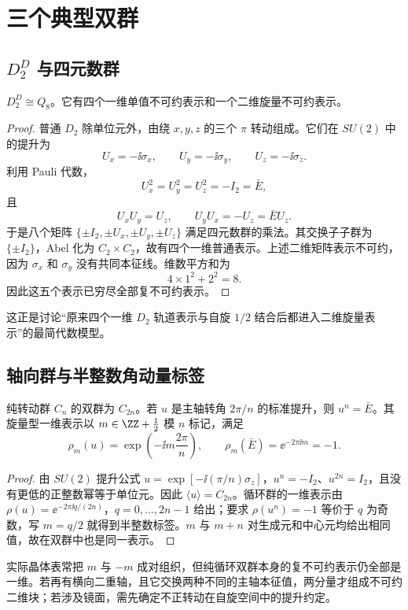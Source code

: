 \section{三个典型双群}

\subsection{\texorpdfstring{$D_2^D$ 与四元数群}{D2 双群与四元数群}}

\begin{proposition}[$D_2$ 的双群与四元数群]
$D_2^D\cong Q_8$。它有四个一维单值不可约表示和一个二维旋量不可约表示。
\end{proposition}
\begin{proof}
普通 $D_2$ 除单位元外，由绕 $x,y,z$ 的三个 $\pi$ 转动组成。它们在 $SU(2)$ 中的提升为
\[
U_x=-\ii\sigma_x,
\qquad
U_y=-\ii\sigma_y,
\qquad
U_z=-\ii\sigma_z.
\]
利用 Pauli 代数，
\[
U_x^2=U_y^2=U_z^2=-I_2=\bar E,
\]
且
\[
U_xU_y=U_z,
\qquad
U_yU_x=-U_z=\bar E U_z.
\]
于是八个矩阵 $\{\pm I_2,\pm U_x,\pm U_y,\pm U_z\}$ 满足四元数群的乘法。其交换子子群为 $\{\pm I_2\}$，Abel 化为 $C_2\times C_2$，故有四个一维普通表示。上述二维矩阵表示不可约，因为 $\sigma_x$ 和 $\sigma_y$ 没有共同本征线。维数平方和为
\[
4\times1^2+2^2=8.
\]
因此这五个表示已穷尽全部复不可约表示。
\end{proof}
这正是讨论“原来四个一维 $D_2$ 轨道表示与自旋 $1/2$ 结合后都进入二维旋量表示”的最简代数模型。

\subsection{轴向群与半整数角动量标签}

\begin{proposition}[循环双群的半整数标签]
纯转动群 $C_n$ 的双群为 $C_{2n}$。若 $u$ 是主轴转角 $2\pi/n$ 的标准提升，则 $u^n=\bar E$。其旋量型一维表示以 $m\in\ZZ+\tfrac12$ 模 $n$ 标记，满足
\[
\rho_m(u)=\exp\left(-\ii m\frac{2\pi}{n}\right),
\qquad \rho_m(\bar E)=\ee^{-2\pi\ii m}=-1.
\]
\end{proposition}
\begin{proof}
由 $SU(2)$ 提升公式 $u=\exp[-\ii(\pi/n)\sigma_z]$，$u^n=-I_2$、$u^{2n}=I_2$，且没有更低的正整数幂等于单位元。因此 $\langle u\rangle=C_{2n}$。循环群的一维表示由 $\rho(u)=\ee^{-2\pi\ii q/(2n)}$，$q=0,\ldots,2n-1$ 给出；要求 $\rho(u^n)=-1$ 等价于 $q$ 为奇数，写 $m=q/2$ 就得到半整数标签。$m$ 与 $m+n$ 对生成元和中心元均给出相同值，故在双群中也是同一表示。
\end{proof}
实际晶体表常把 $m$ 与 $-m$ 成对组织，但纯循环双群本身的复不可约表示仍全部是一维。若再有横向二重轴，且它交换两种不同的主轴本征值，两分量才组成不可约二维块；若涉及镜面，需先确定不正转动在自旋空间中的提升约定。

